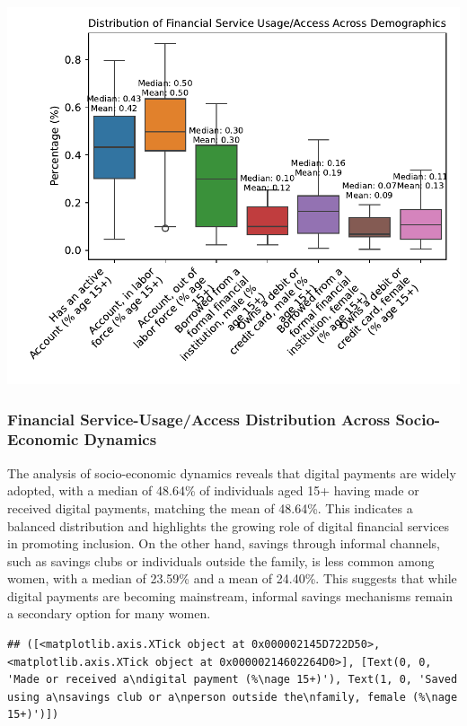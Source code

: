 \documentclass[preprint, 3p,
authoryear]{elsarticle} %
\begin{document}
\begin{center}\includegraphics[width=0.9\linewidth]{Final-Report_files/figure-latex/unnamed-chunk-22-15} \end{center}

\subsubsection{Financial Service-Usage/Access Distribution Across
Socio-Economic
Dynamics}\label{financial-service-usageaccess-distribution-across-socio-economic-dynamics}

The analysis of socio-economic dynamics reveals that digital payments
are widely adopted, with a median of 48.64\% of individuals aged 15+
having made or received digital payments, matching the mean of 48.64\%.
This indicates a balanced distribution and highlights the growing role
of digital financial services in promoting inclusion. On the other hand,
savings through informal channels, such as savings clubs or individuals
outside the family, is less common among women, with a median of 23.59\%
and a mean of 24.40\%. This suggests that while digital payments are
becoming mainstream, informal savings mechanisms remain a secondary
option for many women.

\begin{verbatim}
## ([<matplotlib.axis.XTick object at 0x000002145D722D50>, <matplotlib.axis.XTick object at 0x00000214602264D0>], [Text(0, 0, 'Made or received a\ndigital payment (%\nage 15+)'), Text(1, 0, 'Saved using a\nsavings club or a\nperson outside the\nfamily, female (%\nage 15+)')])
\end{verbatim}
\end{document}
